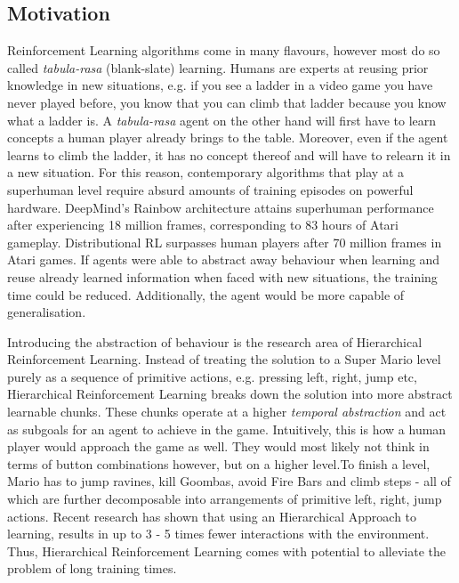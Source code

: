 \documentclass[notitlepage,a4paper,11pt]{article}
\begin{document}
\subsection{Motivation}
Reinforcement Learning algorithms come in many flavours, however most do so called \textit{tabula-rasa} (blank-slate) learning. Humans are experts at reusing prior knowledge in new situations, e.g. if you see a ladder in a video game you have never played before, you know that you can climb that ladder because you know what a ladder is. A \textit{tabula-rasa} agent on the other hand will first have to learn concepts a human player already brings to the table. Moreover, even if the agent learns to climb the ladder, it has no concept thereof and will have to relearn it in a new situation. For this reason, contemporary algorithms that play at a superhuman level require absurd amounts of training episodes on powerful hardware. DeepMind's Rainbow architecture \cite{hessel2018rainbow} attains superhuman performance after experiencing 18 million frames, corresponding to 83
hours of Atari gameplay. Distributional RL \cite{bellemare2017distributional} surpasses human
players after 70 million frames in Atari games. If agents were able to abstract away behaviour when learning and reuse already learned information when faced with new situations, the training time could be reduced. Additionally, the agent would be more capable of generalisation.

Introducing the abstraction of behaviour is the research area of Hierarchical Reinforcement Learning. Instead of treating the solution to a Super Mario level purely as a sequence of primitive actions, e.g. pressing left, right, jump etc, Hierarchical Reinforcement Learning breaks down the solution into more abstract learnable chunks. These chunks operate at a higher \textit{temporal abstraction} and act as subgoals for an agent to achieve in the game. Intuitively, this is how a human player would approach the game as well. They would most likely not think in terms of button combinations however, but on a higher level.To finish a level, Mario has to jump ravines, kill Goombas, avoid Fire Bars and climb steps - all of which are further decomposable into arrangements of primitive left, right, jump actions. Recent research \cite{nachum2019does} has shown that using an Hierarchical Approach to learning, results in up to 3 - 5 times fewer interactions with the environment. Thus, Hierarchical Reinforcement Learning comes with potential to alleviate the problem of long training times. 
\end{document}
